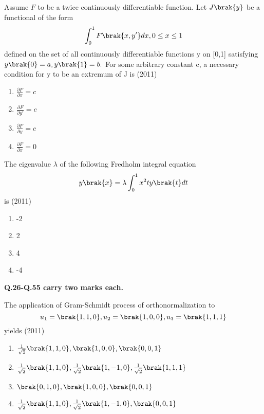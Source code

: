     \item Assume $F$ to be a twice continuously differentiable function. Let $J\brak{y}$ be a functional of the form $$\int_{0}^{1}F\brak{x,y'}dx, 0\leq x\leq 1$$ defined on the set of all continuously differentiable functions y on [0,1] satisfying $y\brak{0}=a,y\brak{1}=b.$ For some arbitrary constant c, a necessary condition for y to be an extremum of J is   \hfill (2011)
    \begin{enumerate}[label=(\Alph*)]
        \item $\frac{\partial F}{\partial x}=c$
        \item $\frac{\partial F}{\partial y'}=c$
        \item $\frac{\partial F}{\partial y}=c$
        \item $\frac{\partial F}{\partial x}=0$
    \end{enumerate}
    \item The eigenvalue $\lambda$ of the following Fredholm integral equation $$y\brak{x}= \lambda\int_{0}^{1}x^2ty\brak{t}dt$$ is  \hfill (2011)
    \begin{enumerate}[label=(\Alph*)]
        \item -2
        \item 2
        \item 4
        \item -4
    \end{enumerate}
    \textbf{Q.26-Q.55 carry two marks each.}
    \item The application of Gram-Schmidt process of orthonormalization to $$u_1 = \brak{1,1,0}, u_2=\brak{1,0,0}, u_3 = \brak{1,1,1}$$ yields  \hfill (2011)
    \begin{enumerate}[label=(\Alph*)]
        \item $\frac{1}{\sqrt{2}}\brak{1,1,0},\brak{1,0,0},\brak{0,0,1}$
        \item $\frac{1}{\sqrt{2}}\brak{1,1,0},\frac{1}{\sqrt{2}}\brak{1,-1,0},\frac{1}{\sqrt{2}}\brak{1,1,1}$ 
        \item $\brak{0,1,0},\brak{1,0,0},\brak{0,0,1}$
        \item $\frac{1}{\sqrt{2}}\brak{1,1,0},\frac{1}{\sqrt{2}}\brak{1,-1,0},\brak{0,0,1}$ 
    \end{enumerate} 

